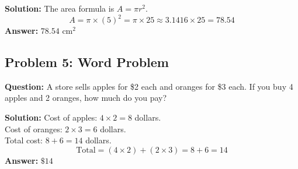 \documentclass{article}
\begin{document}
\textbf{Solution:}
The area formula is \( A = \pi r^2 \).
\[
A = \pi \times (5)^2 = \pi \times 25 \approx 3.1416 \times 25 = 78.54
\]
\textbf{Answer:} \( \boxed{78.54 \text{ cm}^2} \)

\subsection*{Problem 5: Word Problem}
\textbf{Question:} A store sells apples for \$2 each and oranges for \$3 each. If you buy 4 apples and 2 oranges, how much do you pay?

\textbf{Solution:}
Cost of apples: \( 4 \times 2 = 8 \) dollars. \\
Cost of oranges: \( 2 \times 3 = 6 \) dollars. \\
Total cost: \( 8 + 6 = 14 \) dollars.
\[
\text{Total} = (4 \times 2) + (2 \times 3) = 8 + 6 = 14
\]
\textbf{Answer:} \( \boxed{\$14} \)
\end{document}
